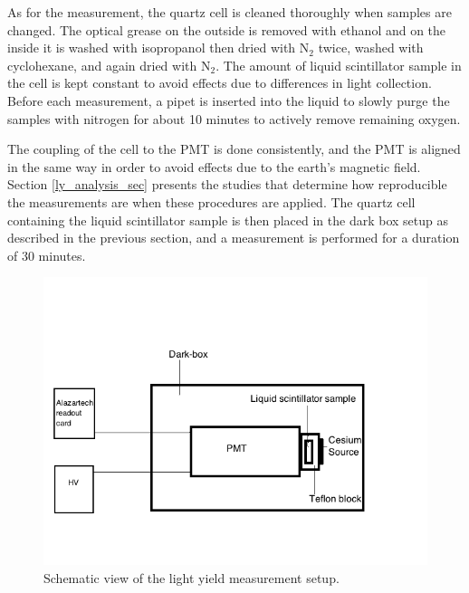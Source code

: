 \documentclass{JINST}
\begin{document}
 As for the measurement, the quartz cell is cleaned thoroughly when samples are changed. The optical grease on the outside is removed with ethanol and on the inside it is washed with isopropanol then dried with N$_{2}$ twice, washed with cyclohexane, and again dried with N$_{2}$. The amount of liquid scintillator sample in the cell is kept constant to avoid effects due to differences in light collection. Before each measurement, a pipet is inserted into the liquid to slowly purge the samples with nitrogen for about 10 minutes to actively remove remaining oxygen. 

The coupling of the cell to the PMT is done consistently, and the PMT is aligned in the same way in order to avoid effects due to the earth's magnetic field. Section \ref{ly_analysis_sec} presents the studies that determine how reproducible the measurements are when these procedures are applied.  The quartz cell containing the liquid scintillator sample is then placed in the dark box setup as described in the previous section, and a measurement is performed for a duration of 30 minutes.
 
\begin{figure}[tbh]
        \begin{center}
        \includegraphics[scale=0.6]{graphs/Diagram_Darkbox.png}
\caption[]{Schematic view of the light yield measurement setup. \label{setup_fig}}
\end{center}
\end{figure}
\end{document}

